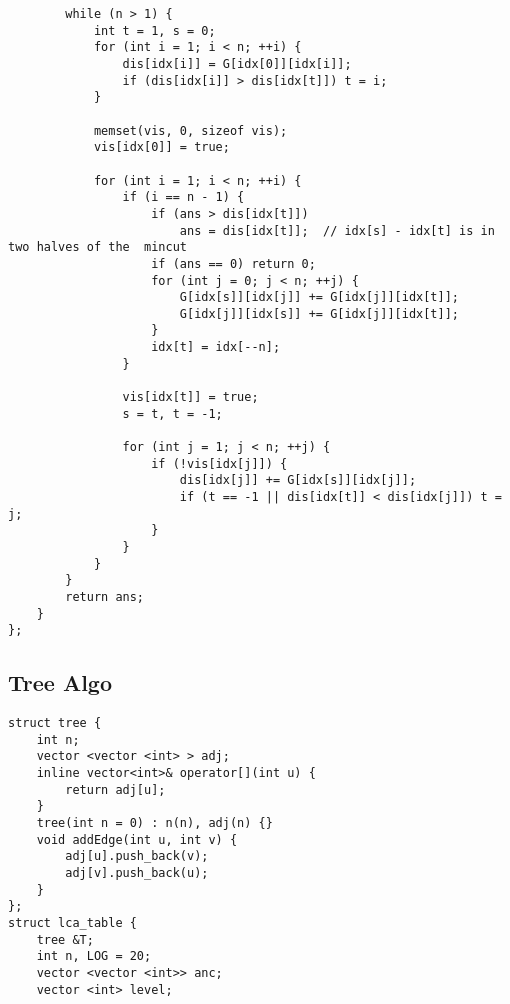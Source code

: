 \documentclass[FSZ,a4paper,onesided]{article}
\begin{document}
\begin{multicols*}{\COLS}
\begin{lstlisting}
        while (n > 1) {
            int t = 1, s = 0;
            for (int i = 1; i < n; ++i) {
                dis[idx[i]] = G[idx[0]][idx[i]];
                if (dis[idx[i]] > dis[idx[t]]) t = i;
            }

            memset(vis, 0, sizeof vis);
            vis[idx[0]] = true;

            for (int i = 1; i < n; ++i) {
                if (i == n - 1) {
                    if (ans > dis[idx[t]])
                        ans = dis[idx[t]];  // idx[s] - idx[t] is in two halves of the  mincut
                    if (ans == 0) return 0;
                    for (int j = 0; j < n; ++j) {
                        G[idx[s]][idx[j]] += G[idx[j]][idx[t]];
                        G[idx[j]][idx[s]] += G[idx[j]][idx[t]];
                    }
                    idx[t] = idx[--n];
                }

                vis[idx[t]] = true;
                s = t, t = -1;

                for (int j = 1; j < n; ++j) {
                    if (!vis[idx[j]]) {
                        dis[idx[j]] += G[idx[s]][idx[j]];
                        if (t == -1 || dis[idx[t]] < dis[idx[j]]) t = j;
                    }
                }
            }
        }
        return ans;
    }
};\end{lstlisting}
\subsection{Tree Algo}
\begin{lstlisting}
struct tree {
    int n;
    vector <vector <int> > adj;
    inline vector<int>& operator[](int u) {
        return adj[u];
    }
    tree(int n = 0) : n(n), adj(n) {}
    void addEdge(int u, int v) {
        adj[u].push_back(v);
        adj[v].push_back(u);
    }
};
struct lca_table {
    tree &T;
    int n, LOG = 20;
    vector <vector <int>> anc;
    vector <int> level;


\end{lstlisting}
\end{multicols*}
\end{document}
